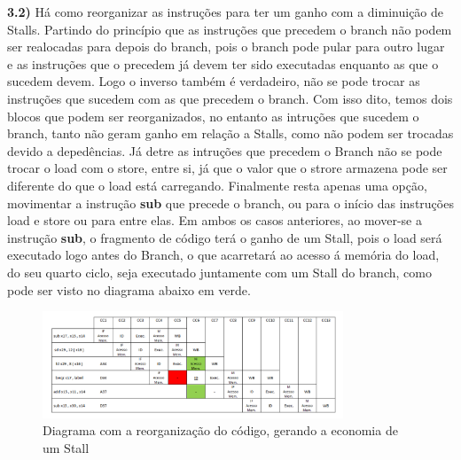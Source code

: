 \documentclass[10pt]{article}
\begin{document}
\bigskip
\bigskip
\textbf{3.2)} H{\'a} como reorganizar as instru{\c c}{\~o}es para ter um ganho com a diminui{\c c}{\~a}o de Stalls.
Partindo do princ{\'i}pio que as instru{\c c}{\~o}es que precedem o branch n{\~a}o podem ser realocadas para depois do branch, pois o branch pode pular para outro lugar e as instru{\c c}{\~o}es que o precedem j{\'a} devem ter sido executadas enquanto as que o sucedem devem. 
Logo o inverso tamb{\'e}m {\'e} verdadeiro, n{\~a}o se pode trocar as instru{\c c}{\~o}es que sucedem com as que precedem o branch. Com isso dito, temos dois blocos que podem ser reorganizados, no entanto as intru{\c c}{\~o}es que sucedem o branch, tanto n{\~a}o geram ganho em rela{\c c}{\~a}o a Stalls, como n{\~a}o podem ser trocadas devido a deped{\^e}ncias.
J{\'a} detre as intru{\c c}{\~o}es que precedem o Branch n{\~a}o se pode trocar o load com o store, entre si, j{\'a} que o valor que o strore armazena pode ser diferente do que o load est{\'a} carregando. Finalmente resta apenas uma op{\c c}{\~a}o, movimentar a instru{\c c}{\~a}o \textbf{sub} que precede o branch, ou para o in{\'i}cio das instru{\c c}{\~o}es load e store ou para entre elas. Em ambos os casos anteriores, ao mover-se a instru{\c c}{\~a}o \textbf{sub}, o fragmento de c{\'o}digo ter{\'a} o ganho de um Stall, pois o load ser{\'a} executado logo antes do Branch, o que acarretar{\'a} ao acesso {\'a} mem{\'o}ria do load, do seu quarto ciclo, seja executado juntamente com um Stall do branch, como pode ser visto no diagrama abaixo em verde.\\\bigskip\bigskip

\begin{figure}[ht!]
\centering
\includegraphics[width=0.80\textwidth]{Diagrama_reorganizacao.png}
\caption{Diagrama com a reorganiza{\c c}{\~a}o do c{\'o}digo, gerando a economia de um Stall}\label{sample image}
\end{figure}
\end{document}
